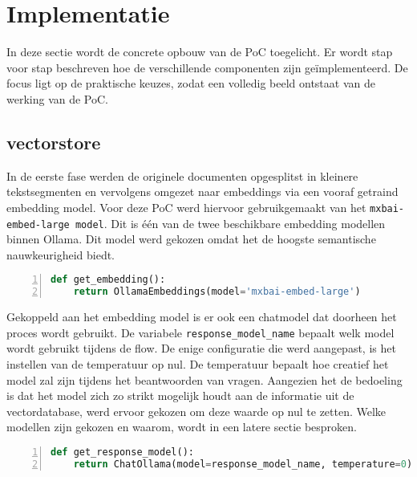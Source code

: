 \section{Implementatie}

In deze sectie wordt de concrete opbouw van de PoC toegelicht. Er wordt stap voor stap beschreven hoe de verschillende componenten zijn geïmplementeerd. De focus ligt op de praktische keuzes, zodat een volledig beeld ontstaat van de werking van de PoC.

\subsection{vectorstore}
In de eerste fase werden de originele documenten opgesplitst in kleinere tekstsegmenten en vervolgens omgezet naar embeddings via een vooraf getraind embedding model. Voor deze PoC werd hiervoor gebruikgemaakt van het \verb|mxbai-embed-large model|. Dit is één van de twee beschikbare embedding modellen binnen Ollama. Dit model werd gekozen omdat het de hoogste semantische nauwkeurigheid biedt.

\begin{lstlisting}[basicstyle=\small, frame=single, breaklines=true, postbreak=\mbox{\textcolor{red}{$\hookrightarrow$}\space}, escapeinside ={\%,}, escapechar={!}, numbers=left, language=Python, caption=Ophalen van embedding model]
def get_embedding():
    return OllamaEmbeddings(model='mxbai-embed-large')
\end{lstlisting}

Gekoppeld aan het embedding model is er ook een chatmodel dat doorheen het proces wordt gebruikt. De variabele \verb|response_model_name| bepaalt welk model wordt gebruikt tijdens de flow. De enige configuratie die werd aangepast, is het instellen van de temperatuur op nul. De temperatuur bepaalt hoe creatief het model zal zijn tijdens het beantwoorden van vragen. Aangezien het de bedoeling is dat het model  zich zo strikt mogelijk houdt aan de informatie uit de vectordatabase, werd ervoor gekozen om deze waarde op nul te zetten. Welke modellen zijn gekozen en waarom, wordt in een latere sectie besproken.

\begin{lstlisting}[basicstyle=\small, frame=single, breaklines=true, postbreak=\mbox{\textcolor{red}{$\hookrightarrow$}\space}, escapeinside ={\%,}, escapechar={!},
numbers=left, language=Python, caption=Initialisatie van het chat model]
def get_response_model():
    return ChatOllama(model=response_model_name, temperature=0)
\end{lstlisting}

